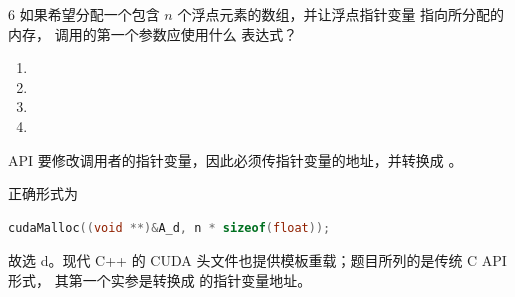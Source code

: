\begin{solutionexercise}{6}
\problemheading 如果希望分配一个包含 $n$ 个浮点元素的数组，并让浮点指针变量
 指向所分配的内存， 调用的第一个参数应使用什么
表达式？
\begin{enumerate}[label=\alph*.,leftmargin=2.2em]
  \item {}
  \item {}
  \item {}
  \item {}
\end{enumerate}

\approachheading API 要修改调用者的指针变量，因此必须传指针变量的地址，并转换成
。

\answerheading 正确形式为
\begin{lstlisting}[language=C++,numbers=none]
cudaMalloc((void **)&A_d, n * sizeof(float));
\end{lstlisting}
故选 d。现代 C++ 的 CUDA 头文件也提供模板重载；题目所列的是传统 C API 形式，
其第一个实参是转换成  的指针变量地址。


\end{solutionexercise}
